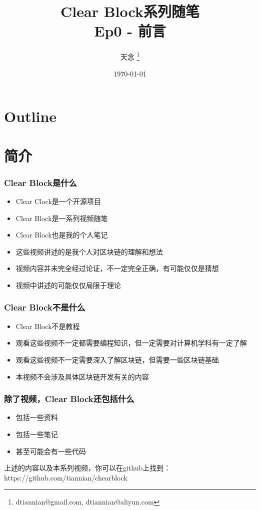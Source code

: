 \documentclass{beamer}
\title{Clear Block系列随笔 \\ Ep0 - 前言}
\author{天念 \thanks{dtiannian@gmail.com, dtiannian@aliyun.com}}
\date{\today}
\begin{document}
\begin{frame}
    \titlepage
\end{frame}

\section*{Outline}


\section{简介}
\begin{frame}
    \frametitle{Clear Block是什么}
    \begin{itemize}
        \item Clear Clock是一个开源项目
        \item Clear Block是一系列视频随笔
        \item Clear Block也是我的个人笔记
        \item 这些视频讲述的是我个人对区块链的理解和想法
        \item 视频内容并未完全经过论证，不一定完全正确，有可能仅仅是猜想
        \item 视频中讲述的可能仅仅局限于理论
    \end{itemize}
\end{frame}

\begin{frame}
    \frametitle{Clear Block不是什么}
    \begin{itemize}
        \item Clear Block不是教程
        \item 观看这些视频不一定都需要编程知识，但一定需要对计算机学科有一定了解
        \item 观看这些视频不一定需要深入了解区块链，但需要一些区块链基础
        \item 本视频不会涉及具体区块链开发有关的内容
    \end{itemize}
\end{frame}

\begin{frame}
    \frametitle{除了视频，Clear Block还包括什么}
    \begin{itemize}
        \item 包括一些资料
        \item 包括一些笔记
        \item 甚至可能会有一些代码
    \end{itemize}
    上述的内容以及本系列视频，你可以在github上找到： \\
    https://github.com/tiannian/chearblock
\end{frame}
\end{document}
